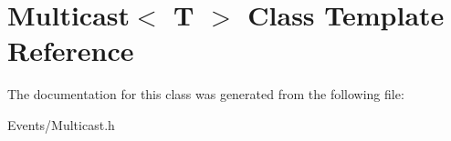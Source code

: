 \hypertarget{classMulticast}{}\section{Multicast$<$ T $>$ Class Template Reference}
\label{classMulticast}


The documentation for this class was generated from the following file\+:\begin{DoxyCompactItemize}
\item 
Events/Multicast.\+h\end{DoxyCompactItemize}
